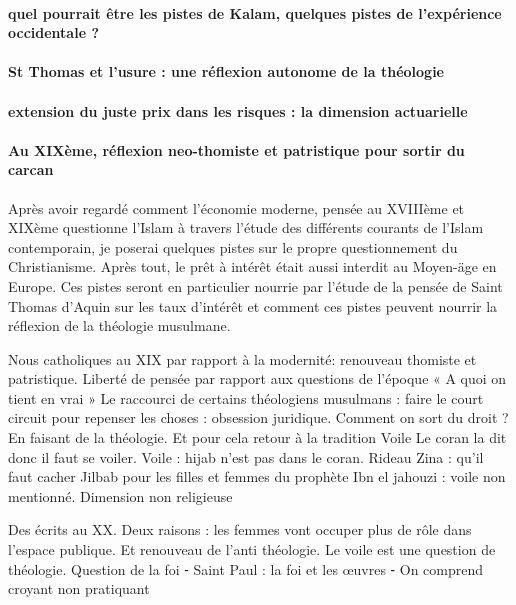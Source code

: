 \paragraph{quel pourrait être les pistes de Kalam, quelques pistes de l'expérience occidentale ?}

\paragraph{St Thomas et l'usure : une réflexion autonome de la théologie}

\paragraph{extension du juste prix dans les risques : la dimension actuarielle}
\paragraph{Au XIXème, réflexion neo-thomiste et patristique pour sortir du carcan}
Après avoir regardé comment l'économie moderne, pensée au XVIIIème et XIXème questionne l'Islam à travers l'étude des différents courants de l'Islam contemporain, je poserai quelques pistes sur le propre questionnement du Christianisme. Après tout, le prêt à intérêt était aussi interdit au Moyen-äge en Europe. Ces pistes seront en particulier nourrie par l'étude de la pensée de Saint Thomas d'Aquin sur les taux d'intérêt et comment ces pistes peuvent nourrir la réflexion de la théologie musulmane. 

Nous catholiques au XIX par rapport à la modernité: renouveau thomiste et patristique. Liberté de pensée par rapport aux questions de l’époque
« A quoi on tient en vrai »
Le raccourci de certains théologiens musulmans : faire le court circuit pour repenser les choses : obsession juridique. Comment on sort du droit ? En faisant de la théologie. Et pour cela retour à la tradition
Voile
Le coran la dit donc il faut se voiler. Voile : hijab n’est pas dans le coran. Rideau
Zina : qu’il faut cacher
Jilbab pour les filles et femmes du prophète 
Ibn el jahouzi : voile non mentionné. Dimension non religieuse

Des écrits au XX. Deux raisons : les femmes vont occuper plus de rôle dans l’espace publique.
Et renouveau de l’anti théologie. Le voile est une question de théologie. Question de la foi
	⁃	Saint Paul : la foi et les œuvres
	⁃	On comprend croyant non pratiquant
	